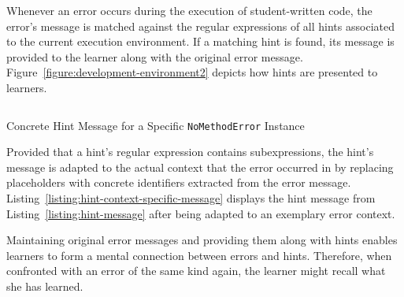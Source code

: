 Whenever an error occurs during the execution of student-written code, the error's message is matched against the regular expressions of all hints associated to the current execution environment. If a matching hint is found, its message is provided to the learner along with the original error message. Figure~\ref{figure:development-environment2} depicts how hints are presented to learners.

\begin{listing}
\inputminted[frame=lines]{text}{listings/hint-context-specific-message.txt}
\vspace{-0.33cm}
\caption{Concrete Hint Message for a Specific \texttt{NoMethodError} Instance}
\label{listing:hint-context-specific-message}
\end{listing}

Provided that a hint's regular expression contains subexpressions, the hint's message is adapted to the actual context that the error occurred in by replacing placeholders with concrete identifiers extracted from the error message. Listing~\ref{listing:hint-context-specific-message} displays the hint message from Listing~\ref{listing:hint-message} after being adapted to an exemplary error context.

Maintaining original error messages and providing them along with hints enables learners to form a mental connection between errors and hints. Therefore, when confronted with an error of the same kind again, the learner might recall what she has learned.
